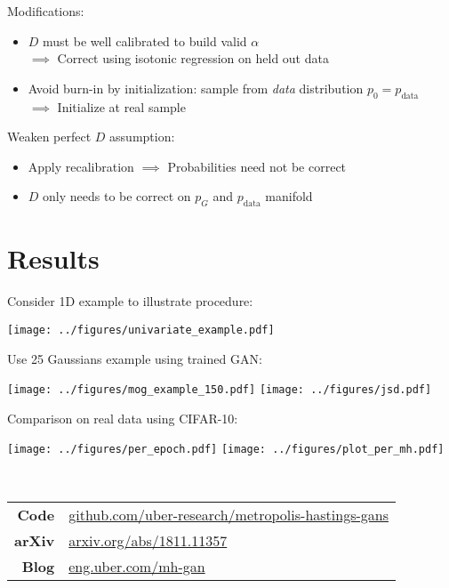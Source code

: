 \documentclass[a0,landscape]{a0poster}
\newcommand{\mysection}[1]{\section*{\fontsize{67.1}{82} \selectfont \color{NavyBlue} #1 \color{Black}}}
\newcommand{\PG}{{p_G}}
\newcommand{\PR}{{p_{\textrm{data}}}}
\newcommand{\accept}{\alpha}
\begin{document}
\begin{multicols}{3}
Modifications:
\begin{itemize}
  \item $D$ must be well calibrated to build valid $\accept$\\$\implies$ Correct using isotonic regression on held out data
  \item Avoid burn-in by initialization: \!sample from \emph{data} distribution $p_0 \!=\! \PR$\\$\implies$ Initialize at real sample
\end{itemize}

Weaken perfect $D$ assumption:
\begin{itemize}
  \item Apply recalibration $\implies$ Probabilities need not be correct
  \item $D$ only needs to be correct on $\PG$ and $\PR$ manifold
\end{itemize}

\columnbreak

\mysection{Results}

Consider 1D example to illustrate procedure:
\begin{center}
\texttt{[image: ../figures/univariate\_example.pdf]}
\end{center}
Use 25 Gaussians example using trained GAN:
\begin{center}
\texttt{[image: ../figures/mog\_example\_150.pdf]}
\hspace{7mm}
\texttt{[image: ../figures/jsd.pdf]}
\end{center}
Comparison on real data using CIFAR-10:
\begin{center}
\texttt{[image: ../figures/per\_epoch.pdf]}
\texttt{[image: ../figures/plot\_per\_mh.pdf]}
\end{center}

~\\

\begin{center}
\begin{tabular}{rl}
\textbf{Code} &
\large {\url{github.com/uber-research/metropolis-hastings-gans}} \\
\textbf{arXiv} &
\large {\url{arxiv.org/abs/1811.11357}} \\
\textbf{Blog} &
\large {\url{eng.uber.com/mh-gan}}
\end{tabular}
\end{center}

\end{multicols}
\end{document}
